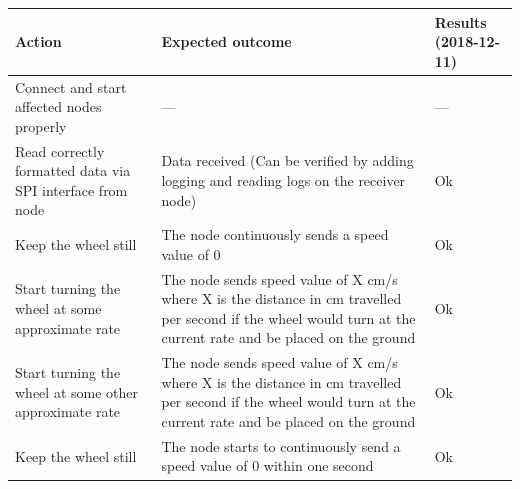 \documentclass[11pt, titlepage]{article} %
\begin{document}
\begin{table}[H]
 \label{tab:title}
\centering
\begin{tabular}{|m{5cm}|m{5cm}|m{5cm}|}
\hline
Action & Expected outcome & Results (2018-12-11) \\ \hline
Connect and start affected nodes properly  &  ---     & ---  \\ \hline
Read correctly formatted data via SPI interface from node  & Data received (Can be verified by adding logging and reading logs on the receiver node)      & Ok  \\ \hline
Keep the wheel still  & The node continuously sends a speed value of 0      & Ok  \\ \hline
Start turning the wheel at some approximate rate  & The node sends speed value of X cm/s where X is the distance in cm travelled per second if the wheel would turn at the current rate and be placed on the ground      & Ok  \\ \hline
Start turning the wheel at some other approximate rate  & The node sends speed value of X cm/s where X is the distance in cm travelled per second if the wheel would turn at the current rate and be placed on the ground      & Ok  \\ \hline
Keep the wheel still  &  The node starts to continuously send a speed value of 0 within one second     & Ok  \\ \hline

\end{tabular}
\end{table}
\end{document}
